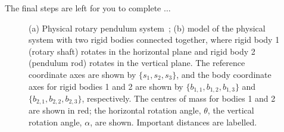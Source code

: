 \documentclass[12pt]{report}
\begin{document}
The final steps are left for you to complete $\dots$
\begin{figure}[htb!]
    \centering
    \quad \quad \quad \quad
    \caption{(a) Physical rotary pendulum system~\cite{Q-Flex-Beam}; (b) model of the physical system with two rigid bodies connected together, where rigid body 1 (rotary shaft) rotates in the horizontal plane and rigid body 2 (pendulum rod) rotates in the vertical plane. The reference coordinate axes are shown by $\{s_1,s_2,s_3\}$, and the body coordinate axes for rigid bodies 1 and 2 are shown by $\{b_{1,1},b_{1,2}, b_{1,3}\}$ and $\{b_{2,1},b_{2,2},b_{2,3}\}$, respectively. The centres of mass for bodies 1 and 2 are shown in red; the horizontal rotation angle, $\theta$, the vertical rotation angle, $\alpha$, are shown. Important distances are labelled.}
    \label{fig:lab2_rotary_pendulum}
\end{figure}
\end{document}
